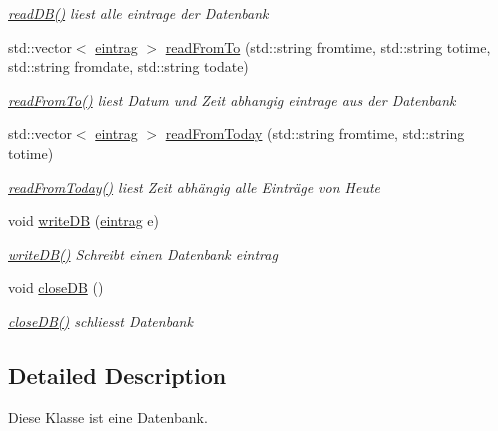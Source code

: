 \begin{DoxyCompactItemize}
\begin{DoxyCompactList}\small\item\em \hyperlink{classSQL_ae0e1ee968392140fc06d1855e5934bd0}{read\-D\-B()} liest alle eintrage der \-Datenbank \end{DoxyCompactList}\item 
std\-::vector$<$ \hyperlink{structeintrag}{eintrag} $>$ \hyperlink{classSQL_ae0d3ae1e4dce91bc7bcad61114337021}{read\-From\-To} (std\-::string fromtime, std\-::string totime, std\-::string fromdate, std\-::string todate)
\begin{DoxyCompactList}\small\item\em \hyperlink{classSQL_ae0d3ae1e4dce91bc7bcad61114337021}{read\-From\-To()} liest \-Datum und \-Zeit abhangig eintrage aus der \-Datenbank \end{DoxyCompactList}\item 
std\-::vector$<$ \hyperlink{structeintrag}{eintrag} $>$ \hyperlink{classSQL_a2906cc9a78de991b6f8d1ae6cf947e7a}{read\-From\-Today} (std\-::string fromtime, std\-::string totime)
\begin{DoxyCompactList}\small\item\em \hyperlink{classSQL_a2906cc9a78de991b6f8d1ae6cf947e7a}{read\-From\-Today()} liest \-Zeit abhängig alle \-Einträge von \-Heute \end{DoxyCompactList}\item 
void \hyperlink{classSQL_aae82ba9a7777686b390f18867a5026bc}{write\-D\-B} (\hyperlink{structeintrag}{eintrag} e)
\begin{DoxyCompactList}\small\item\em \hyperlink{classSQL_aae82ba9a7777686b390f18867a5026bc}{write\-D\-B()} \-Schreibt einen \-Datenbank eintrag \end{DoxyCompactList}\item 
void \hyperlink{classSQL_a8c9cd4df0075e206c262a3fd9e5b5b9c}{close\-D\-B} ()
\begin{DoxyCompactList}\small\item\em \hyperlink{classSQL_a8c9cd4df0075e206c262a3fd9e5b5b9c}{close\-D\-B()} schliesst \-Datenbank \end{DoxyCompactList}\end{DoxyCompactItemize}


\subsection{\-Detailed \-Description}
\-Diese \-Klasse ist eine \-Datenbank. 

